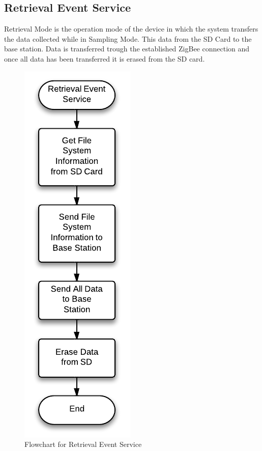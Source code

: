 \subsection{Retrieval Event Service}
Retrieval Mode is the operation mode of the device in which the system transfers the data collected while in Sampling Mode. This data from the SD Card to the base station. Data is transferred trough the established ZigBee connection and once all data has been transferred it is erased from the SD card.
\begin{figure}[H]
	\centering
	\includegraphics[scale=1.0]{img/RetrievalEventService}
	\caption{Flowchart for Retrieval Event Service \label{fig:retrivalMode}}
\end{figure}


